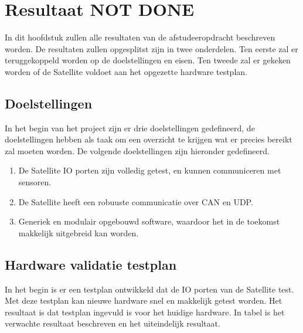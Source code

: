 \chapter{Resultaat NOT DONE}
In dit hoofdstuk zullen alle resultaten van de afstudeeropdracht beschreven worden. De resultaten zullen opgesplitst zijn in twee onderdelen. Ten eerste zal er teruggekoppeld worden op de doelstellingen en eisen. Ten tweede zal er gekeken worden of de Satellite voldoet aan het opgezette hardware testplan.

\section{Doelstellingen}
In het begin van het project zijn er drie doelstellingen gedefineerd, de doelstellingen hebben als taak om een overzicht te krijgen wat er precies bereikt zal moeten worden. De volgende doelstellingen zijn hieronder gedefineerd.
\begin{enumerate}
	\item De Satellite IO porten zijn volledig getest, en kunnen communiceren met sensoren.
	\item De Satellite heeft een robuuste communicatie over CAN en UDP.
	\item Generiek en modulair opgebouwd software, waardoor het in de toekomst makkelijk uitgebreid kan worden.
\end{enumerate}


\section{Hardware validatie testplan}
In het begin is er een testplan ontwikkeld dat de IO porten van de Satellite test. Met deze testplan kan nieuwe hardware snel en makkelijk getest worden. Het resultaat is dat testplan ingevuld is voor het huidige hardware. In tabel is het verwachte resultaat beschreven en het uiteindelijk resultaat.

